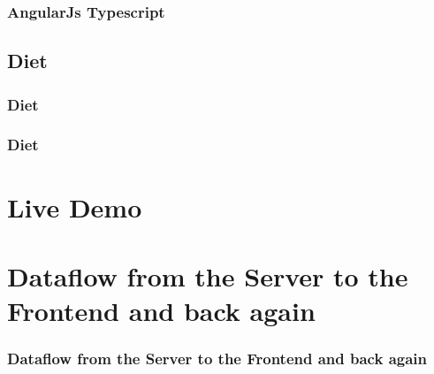 \documentclass[xelatex,13pt]{beamer}
\begin{document}
\begin{frame}
	\frametitle{AngularJs Typescript}
	
\end{frame}

\subsection{Diet}
\begin{frame}
	\frametitle{Diet}
	
	\pause
	
	\pause
\end{frame}
\begin{frame}
	\frametitle{Diet}
	
\end{frame}

\section{Live Demo}

\section{Dataflow from the Server to the Frontend and back again}
\begin{frame}
	\frametitle{Dataflow from the Server to the Frontend and back again}
	
	\pause
	
\end{frame}
\end{document}
